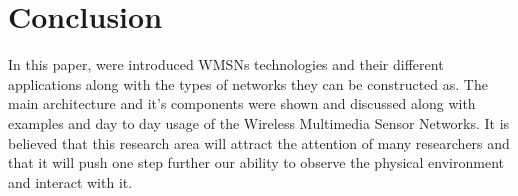 \documentclass[conference]{IEEEtran}
\begin{document}
\section{Conclusion} 
\label{sec:conclusion}

\par \indent In this paper, were introduced WMSNs technologies and their different applications along with the types of networks they can be constructed as. The main architecture and it’s components were shown and discussed along with examples and day to day usage of the Wireless Multimedia Sensor Networks. It is believed that this research area will attract the attention of many researchers and that it will push one step further our ability to observe the physical environment and interact with it. 




\end{document}
